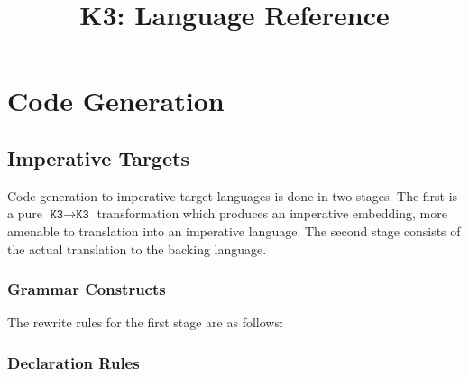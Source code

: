 \documentclass{article}
\title{K3: Language Reference}
\author{}
\date{}
\newcommand{\K}{\texttt{K3}}
\begin{document}
    \maketitle

    \tableofcontents

    \section{Code Generation}
    \subsection{Imperative Targets}

    Code generation to imperative target languages is done in two stages. The first is a pure $\K
    \rightarrow \K$ transformation which produces an imperative embedding, more amenable to
    translation into an imperative language. The second stage consists of the actual translation to
    the backing language.

    \subsubsection{Grammar Constructs}

    The rewrite rules for the first stage are as follows:

    \subsubsection{Declaration Rules}
\end{document}
